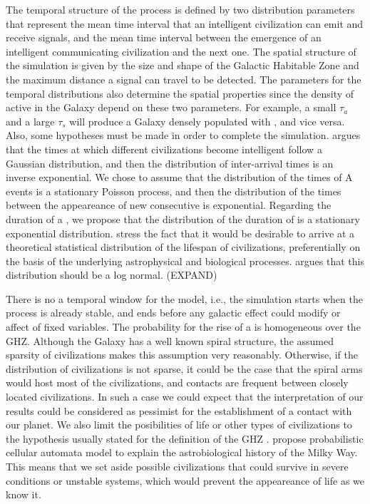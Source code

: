 The temporal structure of the process is defined by two distribution
parameters that represent the mean time interval that an intelligent
civilization can emit and receive signals, and the mean time interval
between the emergence of an intelligent communicating civilization and
the next one.
%
The spatial structure of the simulation is given by the size and shape
of the Galactic Habitable Zone and the maximum distance a signal can
travel to be detected.
%
The parameters for the temporal distributions also determine the
spatial properties since the density of active \cetis{} in the Galaxy
depend on these two parameters.
%
For example, a small $\tau_a$ and a large $\tau_s$ will produce a
Galaxy densely populated with \cetis{}, and vice versa.
%
Also, some hypotheses must be made in order to complete the
simulation.
%
\citet{forgan_spatiotemporal_2011} argues that the times at which
different civilizations become intelligent follow a Gaussian
distribution, and then the distribution of inter-arrival times is an
inverse exponential.
%
We chose to assume that the distribution of the times of A events is a
stationary Poisson process, and then the distribution of the times
between the appeareance of new consecutive \cetis{} is exponential.
%
Regarding the duration of a \ceti{}, we propose that the distribution of
the duration of \cetis{} is a stationary exponential distribution.
%
\citet{balbi_impact_2018} stress the fact that it would be desirable
to arrive at a theoretical statistical distribution of the lifespan of
civilizations, preferentially on the basis of the underlying
astrophysical and biological processes.
%
\citet{maccone_lognormals_2014} argues that this distribution should
be a log normal.  (EXPAND)
 



There is no a temporal window for the model, i.e., the simulation
starts when the process is already stable, and ends before any
galactic effect could modify or affect of fixed variables.
%
The probability for the rise of a \ceti{} is homogeneous over the GHZ.
%
Although the Galaxy has a well known spiral structure, the assumed
sparsity of civilizations makes this assumption very reasonably.
%
Otherwise, if the distribution of civilizations is not sparse, it
could be the case that the spiral arms would host most of the
civilizations, and contacts are frequent between closely located
civilizations.
%
In such a case we could expect that the interpretation of our results
could be considered as pessimist for the establishment of a contact with
our planet.
%
We also limit the posibilities of life or other types of civilizations
to the hypothesis usually stated for the definition of the GHZ
\citep{dayal_habitability_2016, gonzalez_galactic_2001,
lineweaver_galactic_2004, gonzalez_habitable_2005,
morrison_extending_2015, haqq-misra_evolution_2019,
rahvar_cosmic_2016, gobat_evolution_2016, rahvar_cosmic_2016}.
%
\citet{vukotic_astrobiological_2012} propose probabilistic cellular
automata model to explain the astrobiological history of the Milky
Way.
%
This means that we set aside possible civilizations that could survive
in severe conditions or unstable systems, which would prevent the
appeareance of life as we know it.


